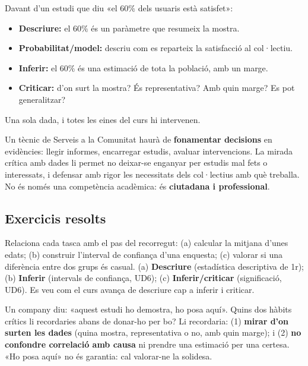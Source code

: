 \begin{exemple}
Davant d'un estudi que diu «el $60\%$ dels usuaris està satisfet»:
\begin{itemize}[leftmargin=1.4em, itemsep=2pt]
  \item \textbf{Descriure:} el $60\%$ és un paràmetre que resumeix la mostra.
  \item \textbf{Probabilitat/model:} descriu com es reparteix la satisfacció al col·lectiu.
  \item \textbf{Inferir:} el $60\%$ és una estimació de tota la població, amb un marge.
  \item \textbf{Criticar:} d'on surt la mostra? És representativa? Amb quin marge? Es pot
        generalitzar?
\end{itemize}
Una sola dada, i totes les eines del curs hi intervenen.
\end{exemple}

\begin{exemple}
Un tècnic de Serveis a la Comunitat haurà de \textbf{fonamentar decisions} en evidències:
llegir informes, encarregar estudis, avaluar intervencions. La mirada crítica amb dades li
permet no deixar-se enganyar per estudis mal fets o interessats, i defensar amb rigor les
necessitats dels col·lectius amb què treballa. No és només una competència acadèmica: és
\textbf{ciutadana i professional}.
\end{exemple}

\subsection{Exercicis resolts}

\begin{exresolt}
Relaciona cada tasca amb el pas del recorregut: (a) calcular la mitjana d'unes edats;
(b) construir l'interval de confiança d'una enquesta; (c) valorar si una diferència entre
dos grups és casual.
\solucio
(a) \textbf{Descriure} (estadística descriptiva de 1r); (b) \textbf{Inferir} (intervals de
confiança, UD6); (c) \textbf{Inferir/criticar} (significació, UD6). Es veu com el curs
avança de descriure cap a inferir i criticar.
\end{exresolt}

\begin{exresolt}
Un company diu: «aquest estudi ho demostra, ho posa aquí». Quins dos hàbits crítics li
recordaries abans de donar-ho per bo?
\solucio
Li recordaria: (1) \textbf{mirar d'on surten les dades} (quina mostra, representativa o no,
amb quin marge); i (2) \textbf{no confondre correlació amb causa} ni prendre una estimació
per una certesa. «Ho posa aquí» no és garantia: cal valorar-ne la solidesa.
\end{exresolt}

